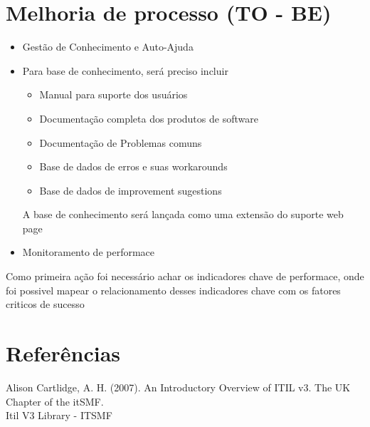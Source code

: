 \documentclass[11pt,a4paper]{article}
\begin{document}
\section{ Melhoria de processo (TO - BE)}

\begin{itemize}[noitemsep]
	\item Gestão de Conhecimento e Auto-Ajuda
	\item	Para base de conhecimento, será preciso incluir
	\begin{itemize}[noitemsep]
		\item Manual para suporte dos usuários
		\item Documentação completa dos produtos de software
		\item Documentação de Problemas comuns
		\item Base de dados de erros e suas workarounds
		\item Base de dados de improvement sugestions
	\end{itemize}
	A base de conhecimento será lançada como uma extensão do
	suporte web page
	\item Monitoramento de performace
\end{itemize}


Como primeira ação foi necessário achar os indicadores chave de performace,
onde foi possivel mapear o relacionamento desses indicadores chave com os fatores
criticos de sucesso

















\section{Referências}
Alison Cartlidge, A. H. (2007). An Introductory Overview of ITIL v3. The UK Chapter of the itSMF.\\
Itil V3 Library - ITSMF \\
\end{document}
